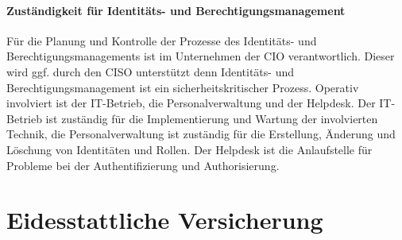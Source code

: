 \documentclass[11pt]{article}
\begin{document}
\paragraph{Zuständigkeit für Identitäts- und Berechtigungsmanagement}
Für die Planung und Kontrolle der Prozesse des Identitäts- und Berechtigungsmanagements ist im Unternehmen der CIO verantwortlich. Dieser wird ggf. durch den CISO unterstützt denn Identitäts- und Berechtigungsmanagement ist ein sicherheitskritischer Prozess. Operativ involviert ist der IT-Betrieb, die Personalverwaltung und der Helpdesk. Der IT-Betrieb ist zuständig für die Implementierung und Wartung der involvierten Technik, die Personalverwaltung ist zuständig für die Erstellung, Änderung und Löschung von Identitäten und Rollen. Der Helpdesk ist die Anlaufstelle für Probleme bei der Authentifizierung und Authorisierung.
\newpage
\section{Eidesstattliche Versicherung}
\newpage
\printbibliography[notkeyword={quelle}, title={Literaturverzeichnis}]
\newpage
\printbibliography[keyword={quelle}, title={Quellenverzeichnis}]
\newpage
\listoffigures
\end{document}
